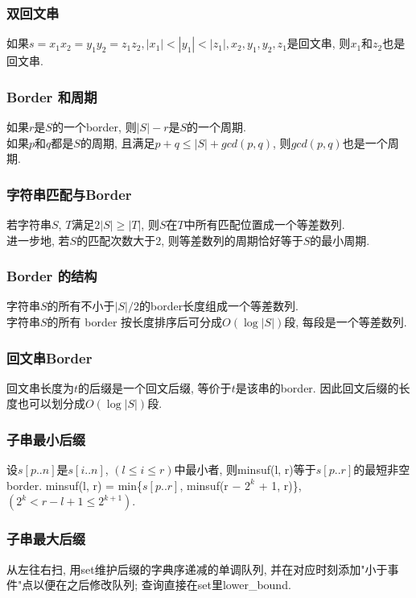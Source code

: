 \subsubsection{双回文串}
\noindent
如果$s=x_1x_2=y_1y_2=z_1z_2, |x_1|<|y_1|<|z_1|, x_2, y_1, y_2, z_1$是回文串, 则$x_1$和$z_2$也是回文串. 

\subsubsection{Border 和周期}
\noindent
如果$r$是$S$的一个border, 则$|S|-r$是$S$的一个周期.\\
如果$p$和$q$都是$S$的周期, 且满足$p+q\le |S|+gcd(p,q)$, 则$gcd(p,q)$也是一个周期.

\subsubsection{字符串匹配与Border}
\noinent
若字符串$S$, $T$满足$2|S|\ge |T|$, 则$S$在$T$中所有匹配位置成一个等差数列.\\
进一步地, 若$S$的匹配次数大于2, 则等差数列的周期恰好等于$S$的最小周期.

\subsubsection{Border 的结构}
\noindent
字符串$S$的所有不小于$|S|/2$的border长度组成一个等差数列.\\
字符串$S$的所有 border 按长度排序后可分成$O(\log{|S|})$段, 每段是一个等差数列. 

\subsubsection{回文串Border}
\noindent
回文串长度为$t$的后缀是一个回文后缀, 等价于$t$是该串的border. 因此回文后缀的长度也可以划分成$O(\log{|S|})$段.

\subsubsection{子串最小后缀}
\noindent
设$s[p..n]$是$s[i..n]$, $(l \leq i \leq r)$中最小者, 则minsuf(l, r)等于$s[p..r]$的最短非空 border. minsuf(l, r) = min\{$s[p..r]$, minsuf(r − $2^k$ + 1, r)\}, $(2^k < r − l + 1 \leq 2^{k+1})$. 

\subsubsection{子串最大后缀}
\noindent
从左往右扫, 用set维护后缀的字典序递减的单调队列, 并在对应时刻添加"小于事件"点以便在之后修改队列; 查询直接在set里lower\_bound. 